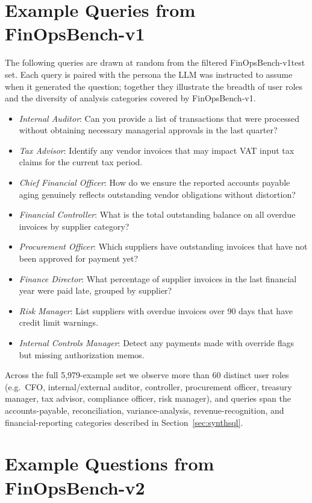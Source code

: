 \documentclass[11pt]{article}
\newcommand{\synthsubset}{FinOpsBench-v1}\xspace
\newcommand{\groundedfinqa}{FinOpsBench-v2}\xspace
\begin{document}
\section{Example Queries from \synthsubset}
\label{app:example_queries}

The following queries are drawn at random from the filtered \synthsubset test set. Each query is paired with the persona the LLM was instructed to assume when it generated the question; together they illustrate the breadth of user roles and the diversity of analysis categories covered by \synthsubset.

\begin{itemize}
    \item \emph{Internal Auditor}: Can you provide a list of transactions that were processed without obtaining necessary managerial approvals in the last quarter?
    \item \emph{Tax Advisor}: Identify any vendor invoices that may impact VAT input tax claims for the current tax period.
    \item \emph{Chief Financial Officer}: How do we ensure the reported accounts payable aging genuinely reflects outstanding vendor obligations without distortion?
    \item \emph{Financial Controller}: What is the total outstanding balance on all overdue invoices by supplier category?
    \item \emph{Procurement Officer}: Which suppliers have outstanding invoices that have not been approved for payment yet?
    \item \emph{Finance Director}: What percentage of supplier invoices in the last financial year were paid late, grouped by supplier?
    \item \emph{Risk Manager}: List suppliers with overdue invoices over 90 days that have credit limit warnings.
    \item \emph{Internal Controls Manager}: Detect any payments made with override flags but missing authorization memos.
\end{itemize}

Across the full 5{,}979-example set we observe more than 60 distinct user roles (e.g.\ CFO, internal/external auditor, controller, procurement officer, treasury manager, tax advisor, compliance officer, risk manager), and queries span the accounts-payable, reconciliation, variance-analysis, revenue-recognition, and financial-reporting categories described in Section~\ref{sec:synthsql}.

\section{Example Questions from \groundedfinqa}
\label{app:example_queries_v2}
\end{document}

